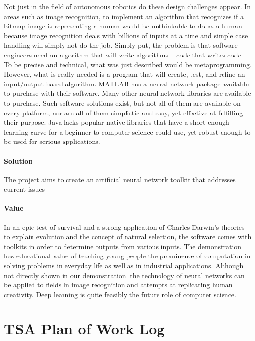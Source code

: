\documentclass[letterpaper, 10pt]{article}
\begin{document}
	Not just in the field of autonomous robotics do these design challenges appear. In areas such as image recognition, to implement an algorithm that recognizes if a bitmap image is representing a human would be unthinkable to do as a human because image recognition deals with billions of inputs at a time and simple case handling will simply not do the job. Simply put, the problem is that software engineers need an algorithm that will write algorithms -- code that writes code. To be precise and technical, what was just described would be metaprogramming. However, what is really needed is a program that will create, test, and refine an input/output-based algorithm. MATLAB has a neural network package available to purchase with their software. Many other neural network libraries are available to purchase. Such software solutions exist, but not all of them are available on every platform, nor are all of them simplistic and easy, yet effective at fulfilling their purpose. Java lacks popular native libraries that have a short enough learning curve for a beginner to computer science could use, yet robust enough to be used for serious applications.
	\paragraph{Solution} The project aims to create an artificial neural network toolkit that addresses current issues
\clearpage
	\paragraph{Value} In an epic test of survival and a strong application of Charles Darwin's theories to explain evolution and the concept of natural selection, the software comes with toolkits in order to determine outputs from various inputs. The demonstration has educational value of teaching young people the prominence of computation in solving problems in everyday life as well as in industrial applications. Although not directly shown in our demonstration, the technology of neural networks can be applied to fields in image recognition and attempts at replicating human creativity. Deep learning is quite feasibly the future role of computer science.
\cleardoublepage
\section{TSA Plan of Work Log}
	
\end{document}
